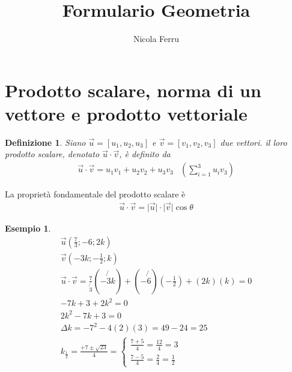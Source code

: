 \documentclass{article}
\title{Formulario Geometria}
\author{Nicola Ferru}
\newcommand{\abs}[1]{\lvert#1\rvert}
\newtheorem{defi}{Definizione}[section]
\newtheorem{esempio}{Esempio}[section]
\begin{document}
\maketitle

\section{Prodotto scalare, norma di un vettore e prodotto vettoriale}
\label{sec:prodScalNormvetteprodvett}
\begin{defi}
  Siano $\vec{u}=[u_1,u_2,u_3]$ e $\vec{v}=[v_1,v_2,v_3]$ due vettori. il loro
  prodotto scalare, denotato $\vec{u}\cdot \vec{v}$, è definito da
  \begin{eqnarray}
    \label{eq:prodottoscalare}
    \vec{u}\cdot \vec{v}=u_1v_1+u_2v_2+u_3v_3 & \left(\sum\limits_{i=1}^3 u_i v_3\right)
  \end{eqnarray}
\end{defi}
La proprietà fondamentale del prodotto scalare è
\begin{eqnarray}
  \label{eq:prodottoscalare1}
  \vec{u}\cdot \vec{v}=\abs{\vec{u}}\cdot\abs{\vec{v}}\cos\theta
\end{eqnarray}
\begin{esempio}
  \begin{eqnarray*}
    \vec{u} \left(\frac{7}{3};-6;2k\right)\\
    \vec{v} \left( -3k; -\frac{1}{2};k\right)\\
    \vec{u}\cdot \vec{v}=\frac{7}{\not{3}}(-\not{3}k)+(-\not{6})(-\frac{1}{2})+
    (2k)(k)=0\\
    -7k+3+2k^2 =0\\
    2k^2-7k+3=0\\
    \Delta k=-7^2-4(2)(3)=49-24=25\\
    k_{\frac{1}{2}}=\frac{+7\pm \sqrt{23}}{4}=
    \begin{cases}
      \frac{7+5}{4}=\frac{12}{4}=3\\
      \frac{7-5}{4}=\frac{2}{4}=\frac{1}{2}
    \end{cases}
  \end{eqnarray*}
\end{esempio}
\end{document}
